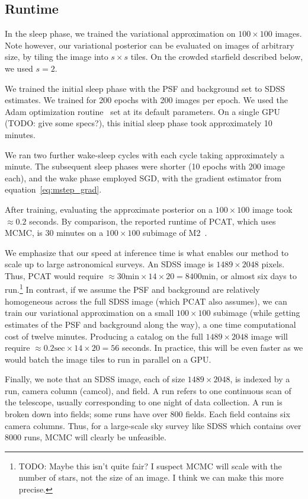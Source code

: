 \subsection{Runtime} 
\label{sec:runtime}
In the sleep phase, we trained the variational approximation on 
$100 \times 100$ images. Note however, our variational posterior can be evaluated on images of arbitrary size, by tiling the image into $s \times s$ tiles. On the crowded starfield described below, we used $s = 2$. 

We trained the initial sleep phase with the PSF and background set to SDSS estimates. We trained for 200 epochs with 200 images per epoch. We used 
the Adam optimization routine~\cite{kingma2014adam} set at its default parameters. On a single GPU (TODO: give some specs?), this initial sleep phase took approximately 10 minutes. 

We ran two further wake-sleep cycles with each cycle taking approximately a minute. The subsequent sleep phases were shorter (10 epochs with 200 image each), and the wake phase employed SGD, with the gradient estimator from equation~\eqref{eq:mstep_grad}. 

After training, evaluating the approximate posterior on a $100 \times 100$ 
image took $\approx 0.2$ seconds. By comparison, the reported runtime of PCAT, which uses MCMC, is 30 minutes on a $100 \times 100$ subimage of M2~\cite{Feder_2019}. 

We emphasize that our speed at inference time is what enables our method to 
scale up to large astronomical surveys. An SDSS image is $1489 \times 2048$ 
pixels. Thus, PCAT would require 
$\approx 30\text{min} \times 14 \times 20 = 8400$min, or almost six days to run.\footnote{TODO: 
Maybe this isn't quite fair? I suspect MCMC will scale
with the number of stars, not the size of an image. I think we can make 
this more precise.}
In contrast, if we assume the PSF and background are relatively homogeneous 
across the full SDSS image (which PCAT also assumes), we can 
train our variational approximation on a small $100 \times 100$ subimage
(while getting estimates of the PSF and background along the way),
a one time computational cost of twelve minutes. 
Producing a catalog on the full $1489 \times 2048$ image will require 
$\approx 0.2\text{sec} \times 14 \times 20 = 56$ seconds. In practice, 
this will be even faster as we would batch the image tiles to run in parallel on a GPU. 

Finally, we note that an SDSS image, each of size $1489 \times 2048$, is indexed by a run, camera column (camcol), and field. A run refers to one continuous scan of the telescope, usually corresponding to one night of data collection. A run is broken down 
into fields; some runs have over 800 fields. Each field contains 
six camera columns. Thus, for a large-scale sky survey like SDSS which 
contains over 8000 runs, MCMC will clearly be unfeasible. 


